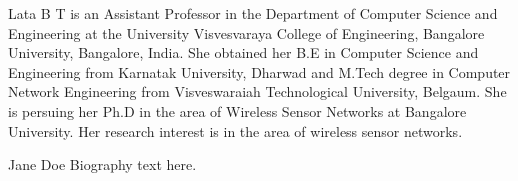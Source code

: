 \documentclass[journal]{IEEEtran}
\begin{document}
\begin{IEEEbiography}{Lata B T}
is an Assistant Professor in the Department of Computer Science and Engineering at the University Visvesvaraya College of Engineering, Bangalore University, Bangalore, India. She obtained her B.E in Computer Science and Engineering from Karnatak University, Dharwad and M.Tech degree in Computer Network Engineering from Visveswaraiah Technological University, Belgaum. She is persuing her Ph.D in the area of Wireless Sensor Networks at Bangalore University. Her research interest is in the area of wireless sensor networks. 
\end{IEEEbiography}



\begin{IEEEbiographynophoto}{Jane Doe}
Biography text here.
\end{IEEEbiographynophoto}






\end{document}
